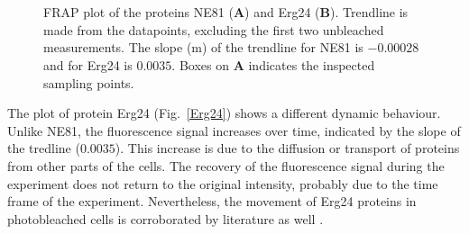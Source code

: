 \begin{figure}[h!]
\centering
{}\\
 \\
\caption[FRAPres]{FRAP plot of the proteins NE81 (\textbf{A}) and Erg24 (\textbf{B}). 
Trendline is made from the datapoints, excluding the first two unbleached measurements. 
The slope (m) of the trendline for NE81 is $-0.00028$ and for Erg24 is $0.0035$. 
Boxes on \textbf{A} indicates the inspected sampling points.} 
\label{fig:FRAPres}
\end{figure}

The plot of protein Erg24 (Fig.~\ref{Erg24}) shows a different dynamic behaviour. 
Unlike NE81, the fluorescence signal increases over time, indicated by the slope of the tredline ($0.0035$). 
This increase is due to the diffusion or transport of proteins from other parts of the cells. The recovery of the fluorescence signal during the experiment does not return to the original intensity, probably due to the time frame of the experiment. 
Nevertheless, the movement of Erg24 proteins in photobleached cells is corroborated by literature as well \cite{Batsios2019}.

